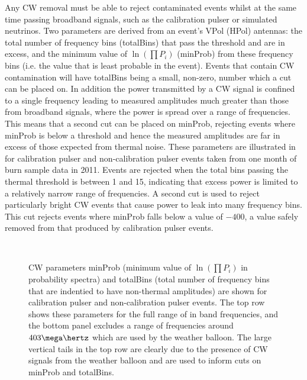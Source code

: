 Any CW removal must be able to reject contaminated events whilst at the same time passing broadband signals, such as the calibration pulser or simulated neutrinos. Two parameters are derived from an event's VPol (HPol) antennas: the total number of frequency bins (totalBins) that pass the threshold and are in excess, and the minimum value of $\ln(\prod P_{i})$ (minProb) from these frequency bins (i.e. the value that is least probable in the event). Events that contain CW contamination will have totalBins being a small, non-zero, number which a cut can be placed on. In addition the power transmitted by a CW signal is confined to a single frequency leading to measured amplitudes much greater than those from broadband signals, where the power is spread over a range of frequencies. This means that a second cut can be placed on minProb, rejecting events where minProb is below a threshold and hence the measured amplitudes are far in excess of those expected from thermal noise. These parameters are illustrated in  for calibration pulser and non-calibration pulser events taken from one month of burn sample data in 2011. Events are rejected when the total bins passing the thermal threshold is between 1 and 15, indicating that excess power is limited to a relatively narrow range of frequencies. A second cut is used to reject particularly bright CW events that cause power to leak into many frequency bins. This cut rejects events where minProb falls below a value of $-400$, a value safely removed from that produced by calibration pulser events. 


\begin{figure}[htpb]
  \hfill
  \\
  \hfill
  \caption{CW parameters minProb (minimum value of $\ln(\prod P_{i})$ in probability spectra) and totalBins (total number of frequency bins that are indentied to have non-thermal amplitudes) are shown for calibration pulser and non-calibration pulser events. The top row shows these parameters for the full range of in band frequencies, and the bottom panel excludes a range of frequencies around $403 \mega \hertz$ which are used by the weather balloon. The large vertical tails in the top row are clearly due to the presence of CW signals from the weather balloon and are used to inform cuts on minProb and totalBins.}
  \label{fig:analysis:CWRemoval:Filtering:CW-MinProb-TotalBins}
\end{figure}


